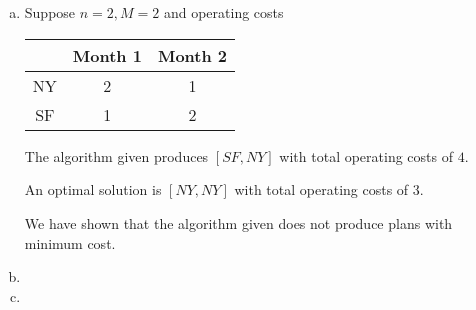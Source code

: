 \documentclass[12pt, a4paper]{article}
\begin{document}
\section{} %

\section{} %

\section{} %
\begin{enumerate}[(a)]
	\item %
	Suppose $n = 2, M = 2$ and operating costs\\
	\begin{tabular}{|c||c|c|}
		\hline
		& Month 1 & Month 2\\
		\hline
		NY & 2 & 1\\
		\hline
		SF & 1 & 2\\
		\hline
	\end{tabular}

	The algorithm given produces $[SF, NY]$ with total operating costs of $4$.

	An optimal solution is $[NY, NY]$ with total operating costs of $3$.

	We have shown that the algorithm given does not produce plans with minimum cost.

	\item %
	\item %
\end{enumerate}
\end{document}
